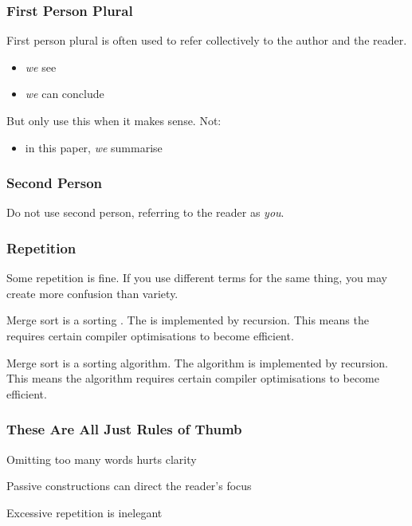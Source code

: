 \begin{frame}
  \frametitle{First Person Plural}

  First person plural is often used to refer collectively to the author and the reader.
  \begin{itemize}
    \item \emph{we} see
    \item \emph{we} can conclude
  \end{itemize}

  \medskip
  \pause

  But only use this when it makes sense. Not:
  \begin{itemize}
    \item in this paper, \emph{we} summarise
  \end{itemize}
\end{frame}

\begin{frame}
  \frametitle{Second Person}

  Do not use second person, referring to the reader as \emph{you}.
\end{frame}

\begin{frame}
  \frametitle{Repetition}

  Some repetition is fine.
  If you use different terms for the same thing, you may create more confusion than variety.

  \medskip
  \pause


  {
    \small
    Merge sort is a sorting .
    The  is implemented by recursion.
    This means the  requires certain compiler optimisations to become efficient.
  }

  \medskip
  \pause


  {
    \small
    Merge sort is a sorting algorithm.
    The algorithm is implemented by recursion.
    This means the algorithm requires certain compiler optimisations to become efficient.
  }
\end{frame}

\begin{frame}
  \frametitle{These Are All Just Rules of Thumb}

  Omitting too many words hurts clarity

  \medskip
  \pause

  Passive constructions can direct the reader's focus

  \medskip
  \pause

  Excessive repetition is inelegant
\end{frame}

